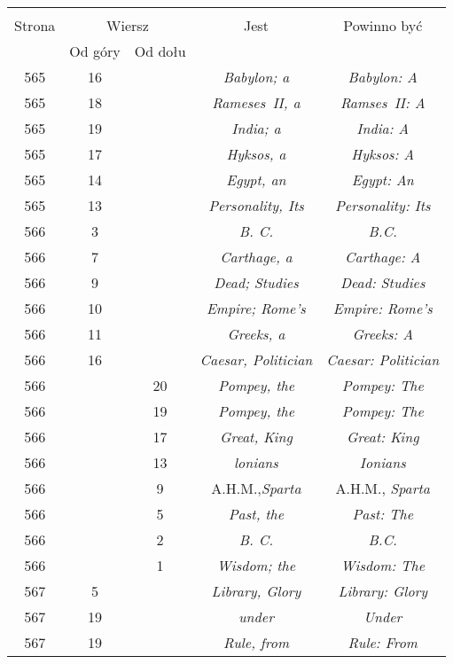 \documentclass[a4paper,11pt]{article}
\begin{document}
\begin{center}
  \begin{tabular}{|c|c|c|c|c|}
    \hline
    & \multicolumn{2}{c|}{} & & \\
    Strona & \multicolumn{2}{c|}{Wiersz} & Jest
                              & Powinno być \\ \cline{2-3}
    & Od góry & Od dołu & & \\
    \hline
    565 & 16 & & \emph{Babylon; a} & \emph{Babylon: A} \\
    565 & 18 & & \emph{Rameses~II, a} & \emph{Ramses~II: A} \\
    565 & 19 & & \emph{India; a} & \emph{India: A} \\
    565 & 17 & & \emph{Hyksos, a} & \emph{Hyksos: A} \\
    565 & 14 & & \emph{Egypt, an} & \emph{Egypt: An} \\
    565 & 13 & & \emph{Personality, Its} & \emph{Personality: Its} \\
    566 &  3 & & \emph{B. C.} & \emph{B.C.} \\
    566 &  7 & & \emph{Carthage, a} & \emph{Carthage: A} \\
    566 &  9 & & \emph{Dead; Studies} & \emph{Dead: Studies} \\
    566 & 10 & & \emph{Empire; Rome's} & \emph{Empire: Rome's} \\
    566 & 11 & & \emph{Greeks, a} & \emph{Greeks: A} \\
    566 & 16 & & \emph{Caesar, Politician} & \emph{Caesar: Politician} \\
    566 & & 20 & \emph{Pompey, the} & \emph{Pompey: The} \\
    566 & & 19 & \emph{Pompey, the} & \emph{Pompey: The} \\
    566 & & 17 & \emph{Great, King} & \emph{Great: King} \\
    566 & & 13 & \emph{lonians} & \emph{Ionians} \\
    566 & &  9 & A.H.M.,\emph{Sparta} & A.H.M., \emph{Sparta} \\
    566 & &  5 & \emph{Past, the} & \emph{Past: The} \\
    566 & &  2 & \emph{B. C.} & \emph{B.C.} \\
    566 & &  1 & \emph{Wisdom; the} & \emph{Wisdom: The} \\
    567 &  5 & & \emph{Library, Glory} & \emph{Library: Glory} \\
    567 & 19 & & \emph{under} & \emph{Under} \\
    567 & 19 & & \emph{Rule, from} & \emph{Rule: From} \\

\end{tabular}
\end{center}
\end{document}
